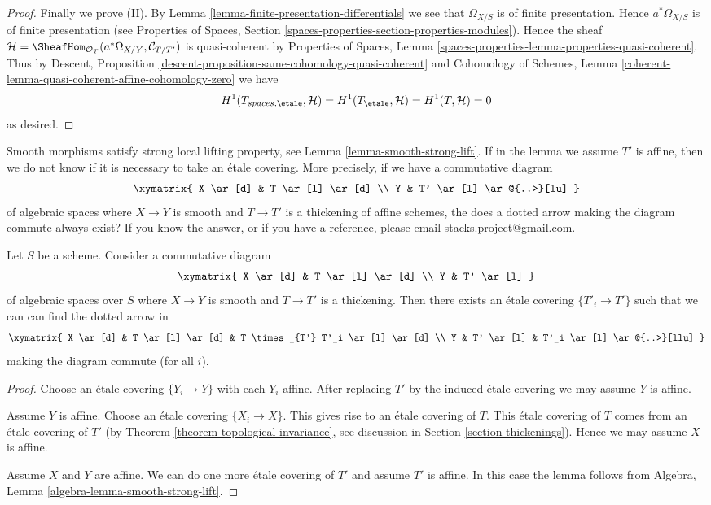 \begin{proof}
\medskip\noindent
Finally we prove (II). By
Lemma \ref{lemma-finite-presentation-differentials}
we see that $\Omega_{X/S}$ is of finite presentation.
Hence $a^*\Omega_{X/S}$ is of finite presentation (see
Properties of Spaces,
Section \ref{spaces-properties-section-properties-modules}).
Hence the sheaf
$\mathcal{H} =
\SheafHom_{\mathcal{O}_T}(a^*\Omega_{X/Y}, \mathcal{C}_{T/T'})$
is quasi-coherent by
Properties of Spaces,
Lemma \ref{spaces-properties-lemma-properties-quasi-coherent}.
Thus by
Descent, Proposition \ref{descent-proposition-same-cohomology-quasi-coherent}
and Cohomology of Schemes, Lemma
\ref{coherent-lemma-quasi-coherent-affine-cohomology-zero}
we have
$$
H^1(T_{spaces, \etale}, \mathcal{H}) =
H^1(T_\etale, \mathcal{H}) =
H^1(T, \mathcal{H}) = 0
$$
as desired.
\end{proof}

\noindent
Smooth morphisms satisfy strong local lifting property, see
Lemma \ref{lemma-smooth-strong-lift}. If in the lemma we
assume $T'$ is affine, then
we do not know if it is necessary to take an \'etale covering.
More precisely, if we have a commutative diagram
$$
\xymatrix{
X \ar[d] & T \ar[l] \ar[d] \\
Y & T' \ar[l] \ar@{..>}[lu]
}
$$
of algebraic spaces where $X \to Y$ is smooth
and $T \to T'$ is a thickening of affine schemes,
the does a dotted arrow making the diagram commute
always exist? If you know the answer, or if you have a reference, please email
\href{mailto:stacks.project@gmail.com}{stacks.project@gmail.com}.

\begin{lemma}
\label{lemma-smooth-strong-lift}
Let $S$ be a scheme. Consider a commutative diagram
$$
\xymatrix{
X \ar[d] & T \ar[l] \ar[d] \\
Y & T' \ar[l]
}
$$
of algebraic spaces over $S$ where $X \to Y$ is smooth
and $T \to T'$ is a thickening. Then there exists an
\'etale covering $\{T'_i \to T'\}$ such that we can
can find the dotted arrow in
$$
\xymatrix{
X \ar[d] & T \ar[l] \ar[d] & T \times_{T'} T'_i \ar[l] \ar[d] \\
Y & T' \ar[l] & T'_i \ar[l] \ar@{..>}[llu]
}
$$
making the diagram commute (for all $i$).
\end{lemma}

\begin{proof}
Choose an \'etale covering $\{Y_i \to Y\}$ with each $Y_i$ affine.
After replacing $T'$ by the induced \'etale covering we may assume
$Y$ is affine.

\medskip\noindent
Assume $Y$ is affine. Choose an \'etale covering $\{X_i \to X\}$.
This gives rise to an \'etale covering of $T$. This \'etale covering of $T$
comes from an \'etale covering of $T'$
(by Theorem \ref{theorem-topological-invariance}, see
discussion in Section \ref{section-thickenings}).
Hence we may assume $X$ is affine.

\medskip\noindent
Assume $X$ and $Y$ are affine. We can do one more \'etale covering of
$T'$ and assume $T'$ is affine. In this case the lemma follows from
Algebra, Lemma \ref{algebra-lemma-smooth-strong-lift}.
\end{proof}








